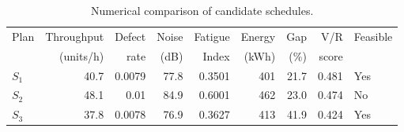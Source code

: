 \begin{table}[htbp]
\centering
\caption{Numerical comparison of candidate schedules.}
\label{tab:numerical-sim}
\small
\begin{tabular}{@{}lrrrrrrrl@{}}
\toprule
Plan & Throughput & Defect & Noise & Fatigue & Energy & Gap & V/R & Feasible \\
     & (units/h)  & rate   & (dB)  & Index   & (kWh)  & (\%) & score &         \\
\midrule
$S_{1}$ & 40.7 & 0.0079 & 77.8 & 0.3501 & 401 & 21.7 & 0.481 & Yes \\
$S_{2}$ & 48.1 & 0.01 & 84.9 & 0.6001 & 462 & 23.0 & 0.474 & No \\
$S_{3}$ & 37.8 & 0.0078 & 76.9 & 0.3627 & 413 & 41.9 & 0.424 & Yes \\
\bottomrule
\end{tabular}
\end{table}

